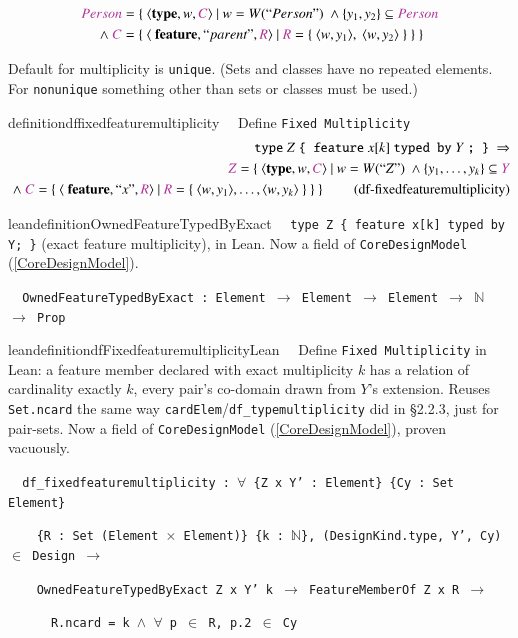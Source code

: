 \begin{gather}
\mc{Person} = \{~\langle \textbf{type},w,\mc{C}\rangle~\vert~w=W(``Person")~\wedge \{y_1,y_2 \} \subseteq \mc{Person} \notag \\
~\wedge~ \mc{C}=\{~\langle~\textbf{feature}, ``parent",\mc{R} \rangle~\vert ~\mc{R}=\{~\langle w,y_1\rangle,~\langle w,y_2\rangle~\}~\}~\} \notag
\end{gather}

\pn Default for multiplicity is \texttt{unique}.  (Sets and classes have no repeated elements.  For \texttt{nonunique} something other than sets or classes must be used.)

\begin{restatable}{definition}{dffixedfeaturemultiplicity}~~   Define \texttt{Fixed Multiplicity}
\begin{align}
\texttt{type}~ Z ~\texttt{\{ feature}~ x[k] ~\texttt{typed by}~ Y~\texttt{; \}}~\Rightarrow  \notag \\
\mc{Z}=\{~\langle \textbf{type},w,\mc{C}\rangle~\vert~w=W(``Z")~\wedge \{y_1,\ldots,y_k \} \subseteq \mc{Y} \notag \\
~\wedge~ \mc{C}=\{~\langle~\textbf{feature}, ``x",\mc{R} \rangle~\vert ~\mc{R}=\{~\langle w,y_1\rangle,\ldots,\langle w,y_k\rangle~\}~\}~\}~\label{eq:df-fixedfeaturemultiplicity}\tag{df-fixedfeaturemultiplicity}
\end{align}
\end{restatable}

\begin{restatable}{leandefinition}{OwnedFeatureTypedByExact}~~ \texttt{type Z \{
feature x[k] typed by Y; \}} (exact feature multiplicity), in Lean. Now a field of \texttt{CoreDesignModel}
(\ref{CoreDesignModel}).

\texttt{~~OwnedFeatureTypedByExact : Element $\to$ Element $\to$ Element $\to$ $\mathbb{N}$ $\to$ Prop}
\label{OwnedFeatureTypedByExact}
\end{restatable}

\begin{restatable}{leandefinition}{dfFixedfeaturemultiplicityLean}~~ Define
\texttt{Fixed Multiplicity} in Lean: a feature member declared with exact multiplicity $k$ has a relation of
cardinality exactly $k$, every pair's co-domain drawn from $Y$'s extension. Reuses \texttt{Set.ncard} the same
way \texttt{cardElem}/\texttt{df\_typemultiplicity} did in \S2.2.3, just for pair-sets. Now a field of
\texttt{CoreDesignModel} (\ref{CoreDesignModel}), proven vacuously.

\texttt{~~df\_fixedfeaturemultiplicity : $\forall$ \{Z x Y' : Element\} \{Cy : Set Element\}}

\texttt{~~~~\{R : Set (Element $\times$ Element)\} \{k : $\mathbb{N}$\}, (DesignKind.type, Y', Cy) $\in$ Design $\to$}

\texttt{~~~~OwnedFeatureTypedByExact Z x Y' k $\to$ FeatureMemberOf Z x R $\to$}

\texttt{~~~~~~R.ncard = k $\wedge$ $\forall$ p $\in$ R, p.2 $\in$ Cy}
\label{df_fixedfeaturemultiplicity}
\end{restatable}

